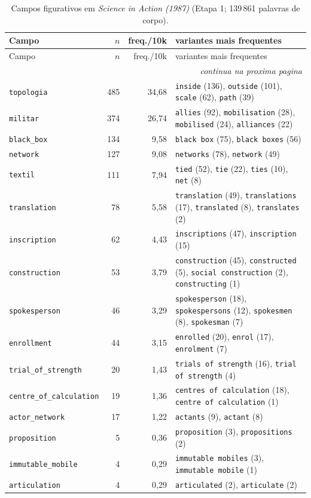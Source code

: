 {\footnotesize
\begin{longtable}{@{}l r r >{\raggedright\arraybackslash}p{6.4cm}@{}}
\caption{Campos figurativos em \emph{Science in Action (1987)} (Etapa 1; 139\,861 palavras de corpo).}\label{tab:campos-sia87}\\
\toprule
Campo & $n$ & freq./10k & variantes mais frequentes \\
\midrule \endfirsthead
\toprule Campo & $n$ & freq./10k & variantes mais frequentes \\ \midrule \endhead
\midrule \multicolumn{4}{r}{\footnotesize \emph{continua na proxima pagina}}\\ \endfoot
\bottomrule \endlastfoot
\texttt{topologia} & 485 & 34{,}68 & \texttt{inside} (136), \texttt{outside} (101), \texttt{scale} (62), \texttt{path} (39) \\
\texttt{militar} & 374 & 26{,}74 & \texttt{allies} (92), \texttt{mobilisation} (28), \texttt{mobilised} (24), \texttt{alliances} (22) \\
\texttt{black\_box} & 134 & 9{,}58 & \texttt{black box} (75), \texttt{black boxes} (56) \\
\texttt{network} & 127 & 9{,}08 & \texttt{networks} (78), \texttt{network} (49) \\
\texttt{textil} & 111 & 7{,}94 & \texttt{tied} (52), \texttt{tie} (22), \texttt{ties} (10), \texttt{net} (8) \\
\texttt{translation} & 78 & 5{,}58 & \texttt{translation} (49), \texttt{translations} (17), \texttt{translated} (8), \texttt{translates} (2) \\
\texttt{inscription} & 62 & 4{,}43 & \texttt{inscriptions} (47), \texttt{inscription} (15) \\
\texttt{construction} & 53 & 3{,}79 & \texttt{construction} (45), \texttt{constructed} (5), \texttt{social construction} (2), \texttt{constructing} (1) \\
\texttt{spokesperson} & 46 & 3{,}29 & \texttt{spokesperson} (18), \texttt{spokespersons} (12), \texttt{spokesmen} (8), \texttt{spokesman} (7) \\
\texttt{enrollment} & 44 & 3{,}15 & \texttt{enrolled} (20), \texttt{enrol} (17), \texttt{enrolment} (7) \\
\texttt{trial\_of\_strength} & 20 & 1{,}43 & \texttt{trials of strength} (16), \texttt{trial of strength} (4) \\
\texttt{centre\_of\_calculation} & 19 & 1{,}36 & \texttt{centres of calculation} (18), \texttt{centre of calculation} (1) \\
\texttt{actor\_network} & 17 & 1{,}22 & \texttt{actants} (9), \texttt{actant} (8) \\
\texttt{proposition} & 5 & 0{,}36 & \texttt{proposition} (3), \texttt{propositions} (2) \\
\texttt{immutable\_mobile} & 4 & 0{,}29 & \texttt{immutable mobiles} (3), \texttt{immutable mobile} (1) \\
\texttt{articulation} & 4 & 0{,}29 & \texttt{articulated} (2), \texttt{articulate} (2) \\
\end{longtable}}

